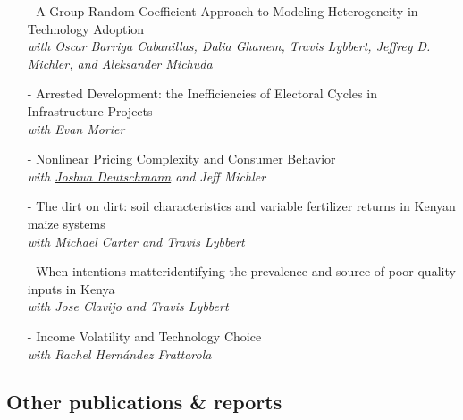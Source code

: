 \documentclass[11pt]{article}
\begin{document}
\begin{itemize}[itemsep=0pt, leftmargin=20pt]
\item [-]{A Group Random Coefficient Approach to Modeling Heterogeneity in Technology Adoption}\\
\emph{with Oscar Barriga Cabanillas, Dalia
Ghanem, Travis Lybbert, Jeffrey D. Michler, and Aleksander Michuda}
\item [-]{Arrested Development: the Inefficiencies
of Electoral Cycles in Infrastructure Projects}\\
\emph{with Evan Morier}
\item [-]Nonlinear Pricing Complexity and Consumer Behavior\\
\emph{with \href{http://jwdeutschmann.com/}{Joshua Deutschmann} and Jeff Michler}
\item [-]{The dirt on dirt: soil characteristics
and variable fertilizer returns in Kenyan maize systems}\\
\emph{with Michael Carter and Travis Lybbert}
\item [-]When intentions matter\textendash identifying the prevalence and source of poor-quality inputs in Kenya\\
\emph{with Jose Clavijo and Travis Lybbert}
\item[-] Income Volatility and Technology Choice \\
\textit{with Rachel Hern\'{a}ndez  Frattarola}
\end{itemize}

\subsection*{\sc Other publications \& reports}
\end{document}
